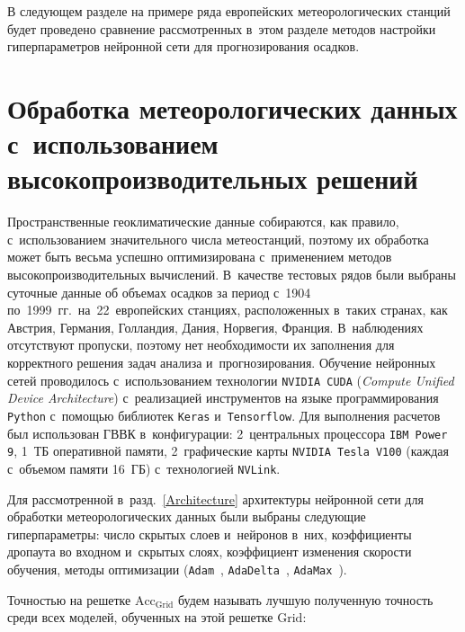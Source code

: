 \begin{multicols}{2}
В следующем разделе на примере ряда европейских метеорологических 
станций будет проведено сравнение рассмотренных в~этом разделе методов 
настройки гиперпараметров нейронной сети для прогнозирования осадков.

\vspace*{-10pt}

\section{Обработка метеорологических данных с~использованием 
высокопроизводительных решений}

\vspace*{-4pt}

Пространственные геоклиматические данные собираются, как правило, с~использованием 
значительного числа метеостанций, поэтому их обработка может быть весьма успешно 
оптимизирована с~применением методов высокопроизводительных вычислений. 
В~качестве тестовых рядов были выбраны суточные данные об объемах осадков за период 
с~1904 по~1999~гг.\ на~22~европейских станциях, расположенных в~таких странах, 
как Австрия, Германия, Голландия, Дания, Норвегия, Франция. 
В~наблюдениях отсутствуют пропуски, поэтому нет необходимости их заполнения 
для корректного решения задач анализа и~прогнозирования. Обучение нейронных сетей 
проводилось с~использованием технологии \verb"NVIDIA CUDA" 
(\textit{Compute Unified Device Architecture}) с~реализацией инструментов 
на языке программирования \verb"Python" с~помощью библиотек \verb"Keras" 
и~\verb"Tensorflow". Для выполнения расчетов был использован ГВВК в~конфигурации: 
2~центральных процессора \verb"IBM Power 9", 1~ТБ оперативной памяти, 
2~графические карты \verb"NVIDIA Tesla V100" (каждая с~объемом памяти 16~ГБ) 
с~технологией \verb"NVLink".

Для рассмотренной в~разд.~\ref{Architecture} архитектуры 
нейронной сети для обработки метеорологических данных были выбраны следующие 
гиперпараметры: число скрытых слоев и~нейронов в~них, коэффициенты 
дропаута во входном и~скрытых слоях, коэффициент изменения скорости 
обучения, методы оптимизации (\verb"Adam"~\cite{Kingma2014}, 
\verb"AdaDelta"~\cite{Zeiler2012}, \verb"AdaMax"~\cite{Buduma2017}).

Точностью на решетке $\mathrm{Acc_{Grid}}$ будем называть лучшую полученную 
точность среди всех моделей, обученных на этой решетке $\mathrm{Grid}$:

\vspace*{2pt}


\end{multicols}

